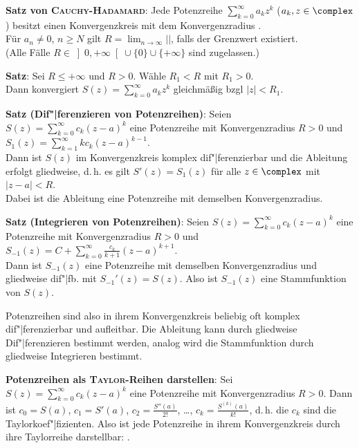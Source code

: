 \linie
\pagebreak

\textbf{Satz von \textsc{Cauchy}-\textsc{Hadamard}}:
Jede Potenzreihe $\sum_{k=0}^\infty a_k z^k$ ($a_k, z \in \complex$)
besitzt einen Konvergenzkreis mit dem Konvergenzradius
. \\
Für $a_n \not= 0$, $n \ge N$ gilt
$R = \lim_{n \to \infty} \Big|$$\Big|$, falls
der Grenzwert existiert. \\
(Alle Fälle $R \in \left]0, +\infty\right[ \cup \{0\} \cup \{+\infty\}$
sind zugelassen.)

\textbf{Satz}: Sei $R \le +\infty$ und $R > 0$.
Wähle $R_1 < R$ mit $R_1 > 0$. \\
Dann konvergiert $S(z) = \sum_{k=0}^\infty a_k z^k$ gleichmäßig
bzgl $|z| < R_1$.

\linie

\textbf{Satz (Dif"|ferenzieren von Potenzreihen)}:
Seien $S(z) = \sum_{k=0}^\infty c_k (z - a)^k$ eine Potenzreihe mit
Konvergenzradius $R > 0$ und
$S_1(z) = \sum_{k=1}^\infty k c_k (z - a)^{k-1}$. \\
Dann ist $S(z)$ im Konvergenzkreis komplex dif"|ferenzierbar und die
Ableitung erfolgt gliedweise, d.\,h. es gilt $S'(z) = S_1(z)$ für alle
$z \in \complex$ mit $|z - a| < R$. \\
Dabei ist die Ableitung eine Potenzreihe mit demselben Konvergenzradius.

\textbf{Satz (Integrieren von Potenzreihen)}:
Seien $S(z) = \sum_{k=0}^\infty c_k (z - a)^k$ eine Potenzreihe mit
Konvergenzradius $R > 0$ und
$S_{-1}(z) = C + \sum_{k=0}^\infty \frac{c_k}{k + 1} (z - a)^{k+1}$. \\
Dann ist $S_{-1}(z)$ eine Potenzreihe mit demselben Konvergenzradius und
gliedweise dif"|fb. mit $S_{-1}'(z) = S(z)$.
Also ist $S_{-1}(z)$ eine Stammfunktion von $S(z)$.

Potenzreihen sind also in ihrem Konvergenzkreis beliebig oft komplex
dif"|ferenzierbar und aufleitbar.
Die Ableitung kann durch gliedweise Dif"|ferenzieren bestimmt werden,
analog wird die Stammfunktion durch gliedweise Integrieren bestimmt.

\linie

\textbf{Potenzreihen als \textsc{Taylor}-Reihen darstellen}:
Sei $S(z) = \sum_{k=0}^\infty c_k (z - a)^k$ eine Potenzreihe mit
Konvergenzradius $R > 0$.
Dann ist $c_0 = S(a)$, $c_1 = S'(a)$, $c_2 = \frac{S''(a)}{2!}$, \ldots,
$c_k = \frac{S^{(k)}(a)}{k!}$, d.\,h. die $c_k$ sind die Taylorkoef"|fizienten.
Also ist jede Potenzreihe in ihrem Konvergenzkreis durch ihre Taylorreihe
darstellbar:
.

